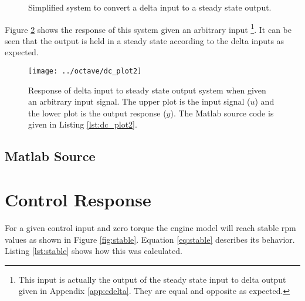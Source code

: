 \documentclass{article}
\begin{document}
\begin{figure}[!htbp]
\begin{center}


\end{center}
\caption{Simplified system to convert a delta input to
a steady state output.}
\label{fig:dc1s}
\end{figure}

Figure \ref{fig:dc_plot2} shows the response of this system given
an arbitrary input
\footnote{This input is actually the output of the steady state input
to delta output given in Appendix \ref{app:cdelta}.
They are equal and opposite as expected.}.
It can be seen that the output is held in a steady state according
to the delta inputs as expected.

\begin{figure}[htbp!]
\texttt{[image: ../octave/dc\_plot2]}
\caption{Response of delta input to steady state output system
when given an arbitrary input signal.
The upper plot is the input signal ($u$) and the lower plot is
the output response ($y$).
The Matlab source code is given in Listing \ref{lst:dc_plot2}.
}
\label{fig:dc_plot2}
\end{figure}

\clearpage
\subsection{Matlab Source}
\label{app:dcsrc}

\nocite{octave}




\clearpage
\section{Control Response}
\label{app:contrpm}

For a given control input and zero torque the engine model will
reach stable rpm values as shown in Figure \ref{fig:stable}.
Equation \ref{eq:stable} describes its behavior.
Listing \ref{lst:stable} shows how this was calculated.
\end{document}
